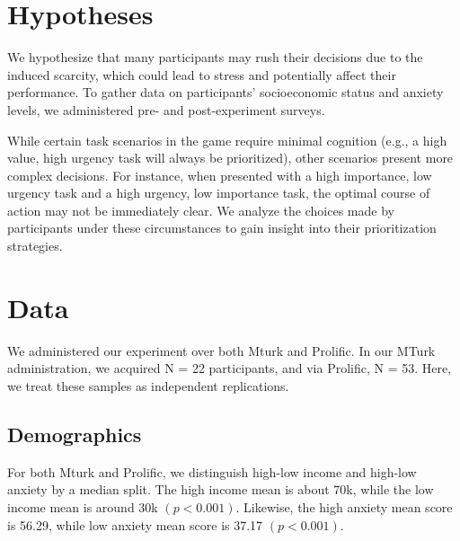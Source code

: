 \documentclass[
]{report}
\begin{document}
\hypertarget{hypotheses}{%
\section{Hypotheses}\label{hypotheses}}

We hypothesize that many participants may rush their decisions due to
the induced scarcity, which could lead to stress and potentially affect
their performance. To gather data on participants' socioeconomic status
and anxiety levels, we administered pre- and post-experiment surveys.

While certain task scenarios in the game require minimal cognition
(e.g., a high value, high urgency task will always be prioritized),
other scenarios present more complex decisions. For instance, when
presented with a high importance, low urgency task and a high urgency,
low importance task, the optimal course of action may not be immediately
clear. We analyze the choices made by participants under these
circumstances to gain insight into their prioritization strategies.

\hypertarget{data}{%
\section{Data}\label{data}}

We administered our experiment over both Mturk and Prolific. In our
MTurk administration, we acquired N = 22 participants, and via Prolific,
N = 53. Here, we treat these samples as independent replications.

\hypertarget{demographics}{%
\subsection{Demographics}\label{demographics}}

For both Mturk and Prolific, we distinguish high-low income and high-low
anxiety by a median split. The high income mean is about 70k, while the
low income mean is around 30k \((p<0.001)\). Likewise, the high anxiety
mean score is 56.29, while low anxiety mean score is 37.17
\((p<0.001)\).
\end{document}
